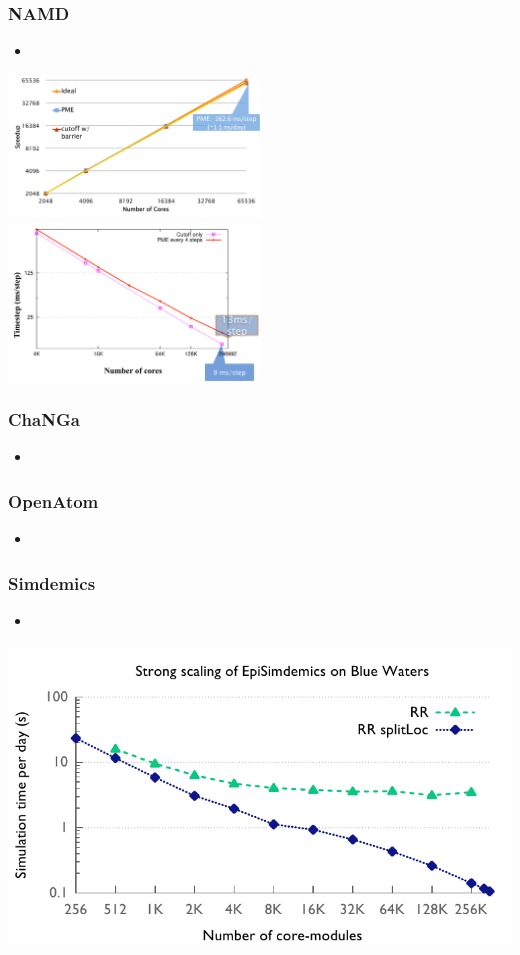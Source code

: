 \begin{frame}
\frametitle{NAMD}
%
\begin{itemize}
\item
\end{itemize}
%
\includegraphics[width=0.5\textwidth]{../figures/namd_bgp.pdf}
\includegraphics[width=0.5\textwidth]{../figures/namd_titan.pdf}
\end{frame}

\begin{frame}
\frametitle{ChaNGa}
%
\begin{itemize}
\item
\end{itemize}
%
\end{frame}

\begin{frame}
\frametitle{OpenAtom}
%
\begin{itemize}
\item
\end{itemize}
%
\end{frame}

\begin{frame}
\frametitle{Simdemics}
%
\begin{itemize}
\item
\end{itemize}
%
\includegraphics[scale=0.8]{../figures/simdemics_strong_scaling.pdf}
\end{frame}

